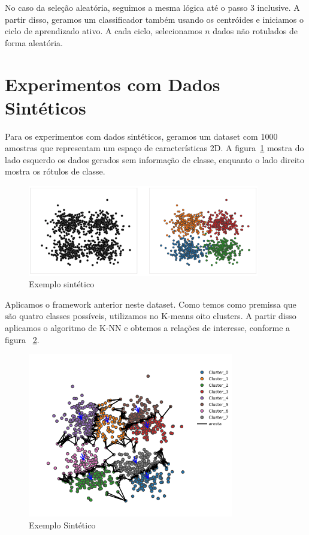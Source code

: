 
No caso da seleção aleatória, seguimos a mesma lógica até o passo 3 inclusive. A partir disso, geramos um classificador também usando os centróides e iniciamos o ciclo de aprendizado ativo. A cada ciclo, selecionamos $n$ dados não rotulados de forma aleatória.

\section{Experimentos com Dados Sintéticos}
\label{sec:experimentos_sinteticos}

Para os experimentos com dados sintéticos, geramos um dataset com 1000 amostras que representam um espaço de características 2D. A figura~\ref{fig:exemplo_sintetico_1} mostra do lado esquerdo os dados gerados sem informação de classe, enquanto o lado direito mostra os rótulos de classe. 


\begin{figure}
  \centering
  \includegraphics[width=0.9\textwidth]{figures/toy_example_1.png}
  \caption{Exemplo sintético}
  \label{fig:exemplo_sintetico_1}
\end{figure}

Aplicamos o framework anterior neste dataset. Como temos como premissa que são quatro classes possíveis, utilizamos no K-means oito clusters. A partir disso aplicamos o algoritmo de K-NN e obtemos a relações de interesse, conforme a figura ~\ref{fig:exemplo_sintetico_2}. 

\begin{figure}
  \centering
  \includegraphics[width=0.8\textwidth]{figures/toy_example_2.png}
  \caption{Exemplo Sintético}
  \label{fig:exemplo_sintetico_2}
\end{figure}

